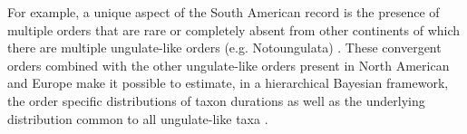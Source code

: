 \documentclass[11pt,letterpaper]{article}
\begin{document}
For example, a unique aspect of the South American record is the presence of multiple orders that are rare or completely absent from other continents of which there are multiple ungulate-like orders (e.g. Notoungulata) \citep{Marshall1982,Macfadden1997,Macfadden2006,Flynn1998a}. These convergent orders combined with the other ungulate-like orders present in North American and Europe make it possible to estimate, in a hierarchical Bayesian framework, the order specific distributions of taxon durations as well as the underlying distribution common to all ungulate-like taxa \citep{Gelman2013d}.




\end{document}
